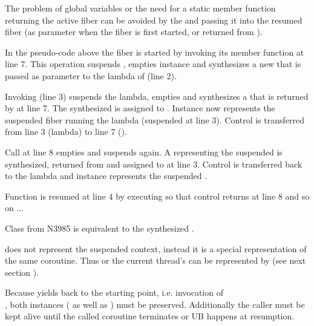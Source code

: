 \label{solution_gpub}


\label{synthesizing}
The problem of global variables or the need for a static member function
returning the active fiber can be avoided by  the
 and passing it into the resumed fiber (as parameter when the
fiber is first started, or returned from \resume).

In the pseudo-code above the fiber  is started by invoking its member
function \resume at line 7. This operation suspends , empties
instance  and synthesizes a new \fiber\xspace {} that is passed as parameter
to the lambda of  (line 2).

Invoking  (line 3) suspends the lambda, empties  and
synthesizes a \fiber that is returned by  at line 7. The
synthesized \fiber is assigned to . Instance  now represents the
suspended fiber running the lambda (suspended at line 3). Control is
transferred from line 3 (lambda) to line 7 ().

Call  at line 8 empties  and suspends 
again. A \fiber representing the suspended  is synthesized, returned
from  and assigned to  at line 3. Control
is transferred back to the lambda and instance  represents the suspended
.

Function  is resumed at line 4 by executing  so that
control returns at line 8 and so on ...

Class  from N3985\cite{N3985} is
 equivalent to the synthesized \fiber.

 does not represent the suspended context,
instead it is a special representation of the same coroutine. Thus \main or
the current thread's \entryfn can  be represented by 
(see next section ).

Because  yields back to the starting
point, i.e. invocation of\\
,
both instances ( as well as ) must be preserved.
Additionally the caller must be kept alive until the called coroutine terminates
or UB happens at resumption.

